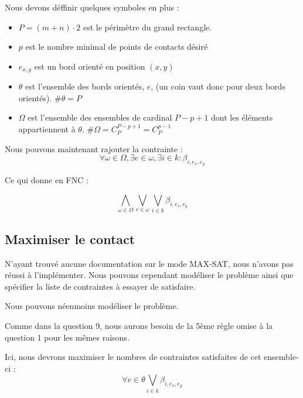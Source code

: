 \documentclass[a4paper]{article}
\begin{document}
Nous devons déffinir quelques symboles en plus :
\begin{itemize}
  \item $P = (m + n) \cdot 2$ est le périmètre du grand rectangle.
  \item $p$ est le nombre minimal de points de contacts désiré
  \item $e_{x,y}$ est un bord orienté en position $(x,y)$
  \item $\theta$ est l'ensemble des bords orientés, $e$,  (un coin vaut donc pour deux bords orientés). $\#\theta = P$
  \item $\Omega$ est l'ensemble des ensembles de cardinal $P-p+1$ dont les éléments appartiennent à $\theta$.
    $\#\Omega = C_P^{P-p+1} = C_P^{p-1}$
\end{itemize}

Nous pouvons maintenant rajouter la contrainte : $$
\forall \omega \in \Omega, \exists e \in \omega, \exists i \in k : \beta_{i, e_x, e_y}
$$

Ce qui donne en FNC :

$$
\bigwedge_{\omega \in \Omega} \bigvee_{e \in \omega} \bigvee_{i \in k} \beta_{i, e_x, e_y}
$$



\subsection{Maximiser le contact}

N'ayant trouvé aucune documentation sur le mode MAX-SAT, nous n'avons pas réussi à l'implémenter.
Nous pouvons cependant modéliser le problème ainsi que spécifier la liste de contraintes à essayer de satisfaire.

Nous pouvons néenmoins modéliser le problème.

Comme dans la question 9, nous aurons besoin de la 5ème règle omise à la question 1 pour les mêmes raisons.

Ici, nous devrons maximiser le nombres de contraintes satisfaites de cet ensemble-ci :
$$
  \forall e \in \theta \bigvee_{i \in k} \beta_{i, e_x, e_y}
$$
\end{document}
